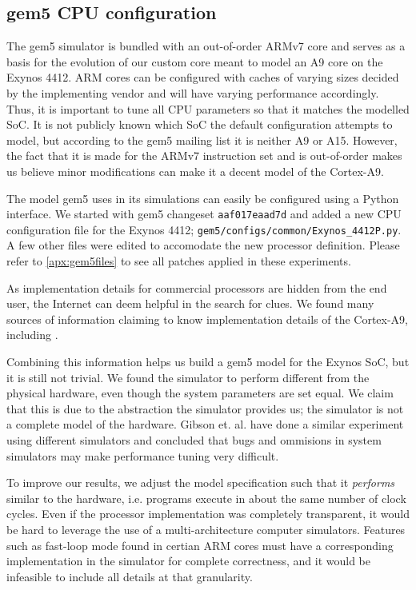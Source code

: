 \subsection{gem5 CPU configuration}
The gem5 simulator is bundled with an out-of-order ARMv7 core and serves as a
basis for the evolution of our custom core meant to model an A9 core on the
Exynos 4412. ARM cores can be configured with caches of varying sizes decided
by the implementing vendor and will have varying performance accordingly. Thus,
it is important to tune all CPU parameters so that it matches the modelled SoC.
It is not publicly known which SoC the default configuration attempts to model,
but according to the gem5 mailing list \cite{a15maillist} it is neither A9 or
A15. However, the fact that it is made for the ARMv7 instruction set and is
out-of-order makes us believe minor modifications can make it a decent model of
the Cortex-A9.

The model gem5 uses in its simulations can easily be configured using a Python
interface. We started with gem5 changeset \texttt{aaf017eaad7d} and added a new
CPU configuration file for the Exynos 4412;
\texttt{gem5/configs/common/Exynos\_4412P.py}. A few other files were edited to
accomodate the new processor definition. Please refer to
\autoref{apx:gem5files} to see all patches applied in these experiments.

As implementation details for commercial processors are hidden from the end
user, the Internet can deem helpful in the search for clues. We found many
sources of information claiming to know implementation details of the Cortex-A9,
including
\cite{blem2013detailed,butko2012accuracy,armtech,exynoswiki,odroidwiki,geekland,7cpu,armcortexa9specs}.

Combining this information helps us build a gem5 model for the Exynos SoC, but
it is still not trivial.  We found the simulator to perform different from the
physical hardware, even though the system parameters are set equal. We claim
that this is due to the abstraction the simulator provides us; the simulator is
not a complete model of the hardware. Gibson et. al. \cite{gibson2000flash} have
done a similar experiment using different simulators and concluded that bugs and
ommisions in system simulators may make performance tuning very difficult.

To improve our results, we adjust the model specification such that it
\textit{performs} similar to the hardware, i.e.  programs execute in about the
same number of clock cycles. Even if the processor implementation was completely
transparent, it would be hard to leverage the use of a multi-architecture
computer simulators. Features such as fast-loop mode found in certian ARM cores
must have a corresponding implementation in the simulator for complete
correctness, and it would be infeasible to include all details at that
granularity.

